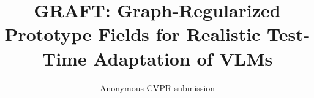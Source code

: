 \documentclass[10pt,twocolumn,letterpaper]{article}
\title{GRAFT: Graph-Regularized Prototype Fields for Realistic Test-Time Adaptation of VLMs}
\author{Anonymous CVPR submission}
\begin{document}
\maketitle










{
    \small
    
    
}

\end{document}
